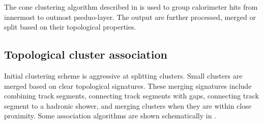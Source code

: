 The cone clustering algorithm described in  is used to group calorimeter hits from innermost to outmost pseduo-layer. The output \clusters are further processed, merged or split based on their topological properties.

\subsection{Topological cluster association}

Initial clustering scheme is aggressive at splitting clusters. Small clusters are merged  based on clear topological signatures. These merging signatures include combining track segments, connecting track segments with gaps, connecting track segment to a hadronic shower, and merging clusters when they are within close proximity. Some association algorithms are shown schematically in .

